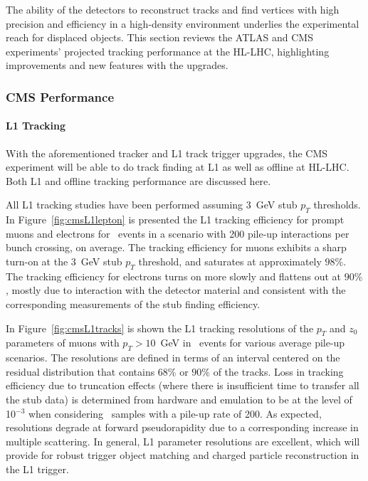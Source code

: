 The ability of the detectors to reconstruct tracks and find vertices with high precision and efficiency in a high-density environment underlies the experimental reach for displaced objects. This section reviews the ATLAS and CMS experiments' projected tracking performance at the HL-LHC, highlighting improvements and new features with the upgrades.

\subsubsection{CMS Performance}

\paragraph{L1 Tracking}

With the aforementioned tracker and L1 track trigger upgrades, the CMS experiment will be able to do track finding at L1 as well as offline at HL-LHC. Both L1 and offline tracking performance are discussed here. 

All L1 tracking studies have been performed assuming 3~GeV stub $p_T$ thresholds. In Figure~\ref{fig:cmsL1lepton} is presented the L1 tracking efficiency for prompt muons and electrons for \ttbar~events in a scenario with 200 pile-up interactions per bunch crossing, on average. The tracking efficiency for muons exhibits a sharp turn-on at the 3~GeV stub $p_T$ threshold, and saturates at approximately $98\%$. The tracking efficiency for electrons turns on more slowly and flattens out at $90\%$, mostly due to interaction with the detector material and consistent with the corresponding measurements of the stub finding efficiency.

In Figure~\ref{fig:cmsL1tracks} is shown the L1 tracking resolutions of the $p_T$ and $z_0$ parameters of muons with $p_T > 10$~GeV in \ttbar~events for various average pile-up scenarios. The resolutions are defined in terms of an interval centered on the residual distribution that contains $68\%$ or $90\%$ of the tracks. Loss in tracking efficiency due to truncation effects (where there is insufficient time to transfer all the stub data) is determined from hardware and emulation to be at the level of 10$^{-3}$ when considering \ttbar~samples with a pile-up rate of 200. As expected, resolutions degrade at forward pseudorapidity due to a corresponding increase in multiple scattering. In general, L1 parameter resolutions are excellent, which will provide for robust trigger object matching and charged particle reconstruction in the L1 trigger.

